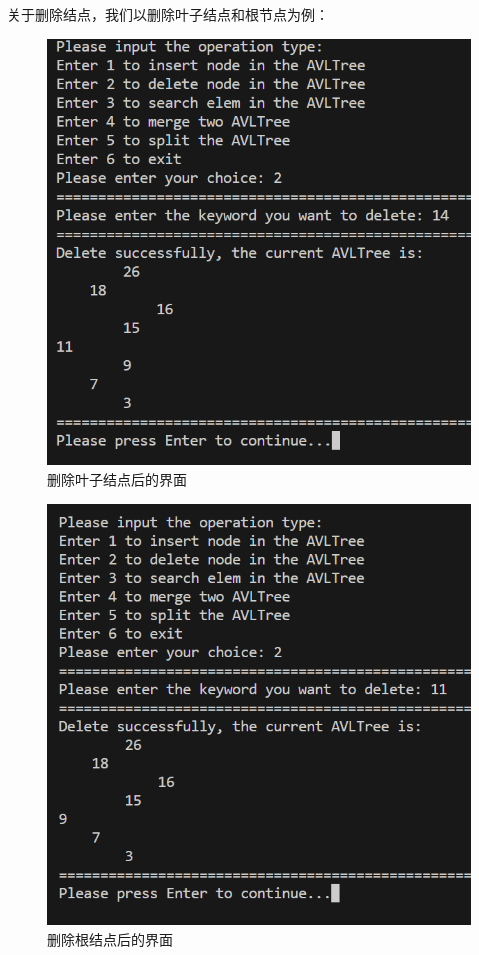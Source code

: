 关于删除结点，我们以删除叶子结点和根节点为例：

\begin{figure}[H]
  \centering
  \includegraphics[width=13cm]{fig/AVLTree28.png}
  \caption{删除叶子结点后的界面}
\end{figure}

\begin{figure}[H]
  \centering
  \includegraphics[width=13cm]{fig/AVLTree29.png}
  \caption{删除根结点后的界面}
\end{figure}

